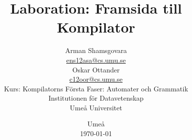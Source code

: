 \title{
Laboration: Framsida till Kompilator
}
\date{
Umeå\\
\today
}
\author{
Arman Shamsgovara\\
\url{ens12asa@cs.umu.se}\\
Oskar Ottander\\
\url{c12oor@cs.umu.se}
\vspace{0.5in}\\
Kurs: Kompilatorns Första Faser: Automater och Grammatik\\
Institutionen för Datavetenskap\\
Umeå Universitet\\
\vspace{1in}
}

